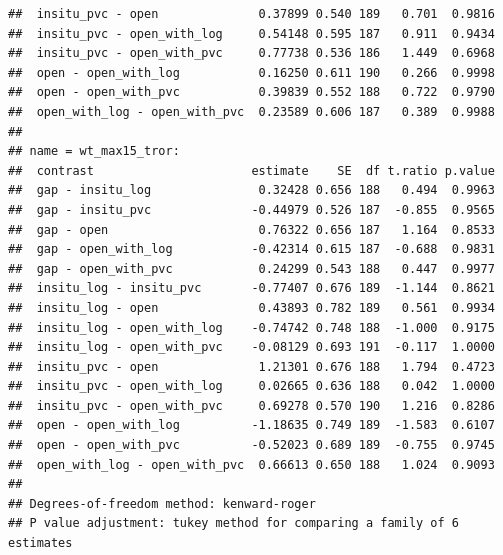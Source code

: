 \documentclass[
]{article}
\begin{document}
\begin{verbatim}
##  insitu_pvc - open              0.37899 0.540 189   0.701  0.9816
##  insitu_pvc - open_with_log     0.54148 0.595 187   0.911  0.9434
##  insitu_pvc - open_with_pvc     0.77738 0.536 186   1.449  0.6968
##  open - open_with_log           0.16250 0.611 190   0.266  0.9998
##  open - open_with_pvc           0.39839 0.552 188   0.722  0.9790
##  open_with_log - open_with_pvc  0.23589 0.606 187   0.389  0.9988
## 
## name = wt_max15_tror:
##  contrast                      estimate    SE  df t.ratio p.value
##  gap - insitu_log               0.32428 0.656 188   0.494  0.9963
##  gap - insitu_pvc              -0.44979 0.526 187  -0.855  0.9565
##  gap - open                     0.76322 0.656 187   1.164  0.8533
##  gap - open_with_log           -0.42314 0.615 187  -0.688  0.9831
##  gap - open_with_pvc            0.24299 0.543 188   0.447  0.9977
##  insitu_log - insitu_pvc       -0.77407 0.676 189  -1.144  0.8621
##  insitu_log - open              0.43893 0.782 189   0.561  0.9934
##  insitu_log - open_with_log    -0.74742 0.748 188  -1.000  0.9175
##  insitu_log - open_with_pvc    -0.08129 0.693 191  -0.117  1.0000
##  insitu_pvc - open              1.21301 0.676 188   1.794  0.4723
##  insitu_pvc - open_with_log     0.02665 0.636 188   0.042  1.0000
##  insitu_pvc - open_with_pvc     0.69278 0.570 190   1.216  0.8286
##  open - open_with_log          -1.18635 0.749 189  -1.583  0.6107
##  open - open_with_pvc          -0.52023 0.689 189  -0.755  0.9745
##  open_with_log - open_with_pvc  0.66613 0.650 188   1.024  0.9093
## 
## Degrees-of-freedom method: kenward-roger 
## P value adjustment: tukey method for comparing a family of 6 estimates
\end{verbatim}
\end{document}
